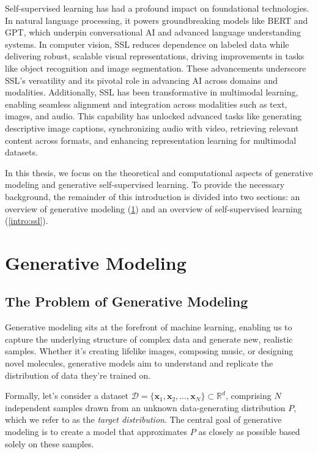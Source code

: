Self-supervised learning has had a profound impact on foundational technologies. In natural language processing, it powers groundbreaking models like BERT and GPT, which underpin conversational AI and advanced language understanding systems. In computer vision, SSL reduces dependence on labeled data while delivering robust, scalable visual representations, driving improvements in tasks like object recognition and image segmentation. These advancements underscore SSL’s versatility and its pivotal role in advancing AI across domains and modalities. Additionally, SSL has been transformative in multimodal learning, enabling seamless alignment and integration across modalities such as text, images, and audio. This capability has unlocked advanced tasks like generating descriptive image captions, synchronizing audio with video, retrieving relevant content across formats, and enhancing representation learning for multimodal datasets.

In this thesis, we focus on the theoretical and computational aspects of generative modeling and generative self-supervised learning. To provide the necessary background, the remainder of this introduction is divided into two sections: an overview of generative modeling (\ref{intro:generative_modeling}) and an overview of self-supervised learning (\ref{intro:ssl}).


\section{Generative Modeling}\label{intro:generative_modeling}
\subsection{The Problem of Generative Modeling}

Generative modeling sits at the forefront of machine learning, enabling us to capture the underlying structure of complex data and generate new, realistic samples. Whether it's creating lifelike images, composing music, or designing novel molecules, generative models aim to understand and replicate the distribution of data they're trained on.

Formally, let's consider a dataset \( \mathcal{D} = \{ \mathbf{x}_1, \mathbf{x}_2, \dots, \mathbf{x}_N \} \subset \mathbb{R}^d \), comprising \( N \) independent samples drawn from an unknown data-generating distribution \( P \), which we refer to as the \textit{target distribution}. The central goal of generative modeling is to create a model that approximates \( P \) as closely as possible based solely on these samples.

